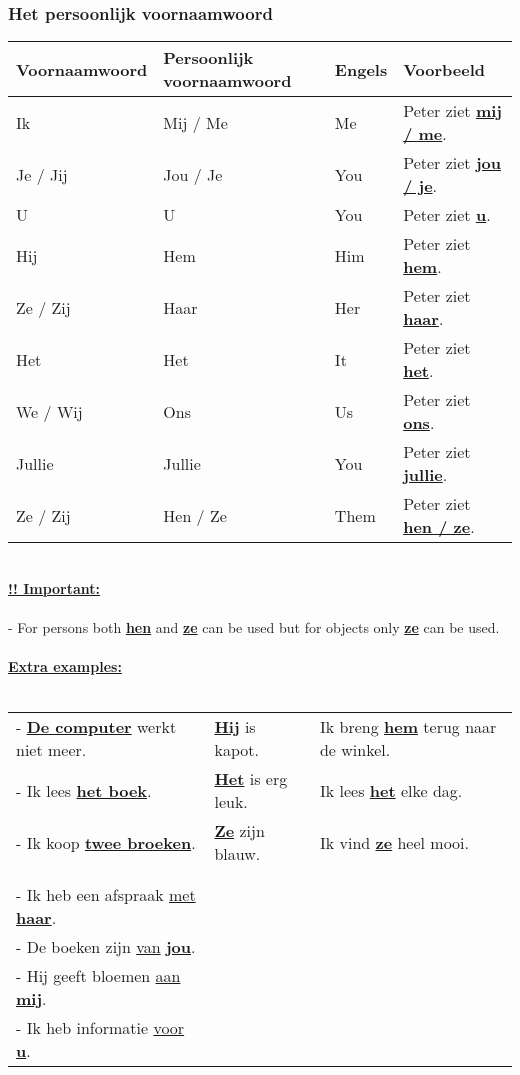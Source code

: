 \documentclass[a4paper,14pt]{extarticle}
\newcommand{\attention}[1]{\underline{\textbf{!! #1}}}
\newcommand{\emp}[1]{\underline{\textbf{#1}}}
\begin{document}
\subsubsection{Het persoonlijk voornaamwoord}
\begin{tabularx}{\textwidth}{ p{} p{} p{} p{} }
 \hline
 Voornaamwoord & Persoonlijk voornaamwoord & Engels &  Voorbeeld \\
 \hline
 Ik & Mij / Me & Me & Peter ziet \emp{mij / me}. \\
 Je / Jij & Jou / Je & You & Peter ziet \emp{jou / je}. \\
 U & U & You & Peter ziet \emp{u}. \\
 Hij & Hem & Him & Peter ziet \emp{hem}. \\
 Ze / Zij & Haar & Her & Peter ziet \emp{haar}. \\
 Het & Het & It & Peter ziet \emp{het}. \\
 We / Wij & Ons & Us & Peter ziet \emp{ons}. \\
 Jullie & Jullie & You & Peter ziet \emp{jullie}. \\
 Ze / Zij & Hen / Ze & Them & Peter ziet \emp{hen / ze}. \\ 
\end{tabularx} 
\newpage
\hfill \\
\attention{Important:} \\ \\
- For persons both \emp{hen} and \emp{ze} can be used but for objects only \emp{ze} can be used. \\ \\
\emp{Extra examples:} \\ \\
\begin{tabularx}{\textwidth}{ p{} p{} p{}}
- \emp{De computer} werkt niet meer. & \emp{Hij} is kapot. & Ik breng \emp{hem} terug naar de winkel. \\
- Ik lees \emp{het boek}. & \emp{Het} is erg leuk. & Ik lees \emp{het} elke dag. \\
- Ik koop \emp{twee broeken}. & \emp{Ze} zijn blauw. & Ik vind \emp{ze} heel mooi. \\
\\\hline\\
- Ik heb een afspraak \underline{met} \emp{haar}. \\
- De boeken zijn \underline{van} \emp{jou}. \\
- Hij geeft bloemen \underline{aan} \emp{mij}. \\
- Ik heb informatie \underline{voor} \emp{u}. \\
\end{tabularx}
\end{document}
